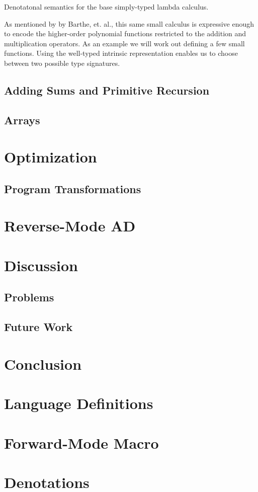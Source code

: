 \documentclass[11pt, final]{article}
\begin{document}
  \begin{listing}
    \begin{verbatim}
    \end{verbatim}
    \caption{Denotatonal semantics for the base simply-typed lambda calculus.}
    \label{lst:denotation_base}
  \end{listing}

  As mentioned by by Barthe, et. al.\cite{barthe2020versatility}, this same small calculus is expressive enough to encode the higher-order polynomial functions restricted to the addition and multiplication operators.
  As an example we will work out defining a few small functions.
  Using the well-typed intrinsic representation enables us to choose between two possible type signatures.

  \subsection{Adding Sums and Primitive Recursion}
  \subsection{Arrays}
\section{Optimization}
  \subsection{Program Transformations}
\section{Reverse-Mode AD}
\section{Discussion}
  \subsection{Problems}
  \subsection{Future Work}
\section{Conclusion}

\appendix
\section{Language Definitions}
\section{Forward-Mode Macro}
\section{Denotations}
\printbibliography
\makeatother
\end{document}
